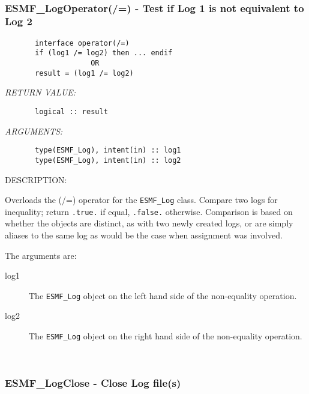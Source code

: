  
\mbox{}\hrulefill\ 
 
\subsubsection [ESMF\_LogOperator(/=)] {ESMF\_LogOperator(/=) - Test if Log 1 is not equivalent to Log 2}


  
\begin{verbatim}       interface operator(/=)
       if (log1 /= log2) then ... endif
                    OR
       result = (log1 /= log2)\end{verbatim}{\em RETURN VALUE:}
\begin{verbatim}       logical :: result\end{verbatim}{\em ARGUMENTS:}
\begin{verbatim}       type(ESMF_Log), intent(in) :: log1
       type(ESMF_Log), intent(in) :: log2\end{verbatim}
{\sf DESCRIPTION:\\ }


       Overloads the (/=) operator for the {\tt ESMF\_Log} class.
       Compare two logs for inequality; return {\tt .true.} if equal,
       {\tt .false.} otherwise.  Comparison is based on whether the objects
       are distinct, as with two newly created logs, or are simply aliases
       to the same log as would be the case when assignment was involved.
  
       The arguments are:
       \begin{description}
       \item[log1]
            The {\tt ESMF\_Log} object on the left hand side of the non-equality
            operation.
       \item[log2]
            The {\tt ESMF\_Log} object on the right hand side of the non-equality
            operation.
       \end{description}
   
 
\mbox{}\hrulefill\ 
 
\subsubsection [ESMF\_LogClose] {ESMF\_LogClose - Close Log file(s)}


